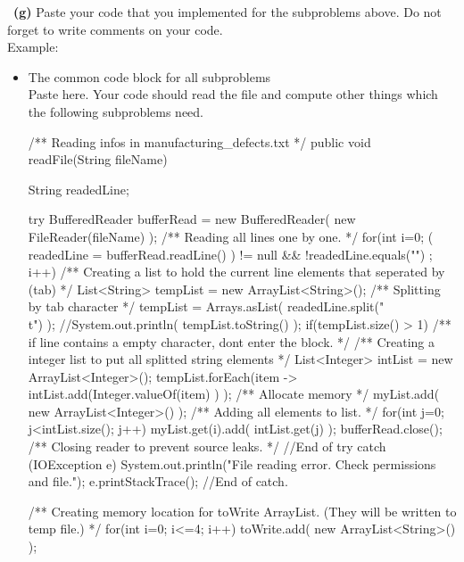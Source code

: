 \documentclass[a4 paper]{article}
\numberwithin{equation}{section}
\newcommand{\subproblem}[1]{~\newline\textbf{(#1)}}
\newcommand{\0}{\mathbf{0}}
\begin{document}
	\subproblem{g} Paste your code that you implemented for the subproblems above. Do not forget to write comments on your code.\\
	Example:\\
	\begin{itemize}
		\item The common code block for all subproblems\\
    		
		Paste here. Your code should read the file and compute other things which the following subproblems need.
            \begin{python}[frame=single]
            /** Reading infos in manufacturing_defects.txt */
    public void readFile(String fileName) {
        String readedLine; 

        try{
            BufferedReader bufferRead = new BufferedReader( new FileReader(fileName) );
            /** Reading all lines one by one. */
            for(int i=0; ( readedLine = bufferRead.readLine() ) != null && !readedLine.equals("\n") ; i++){
                /** Creating a list to hold the current line elements that seperated by (tab) */
                List<String> tempList = new ArrayList<String>();
                /** Splitting by tab character */
                tempList = Arrays.asList( readedLine.split("\\t") );
                //System.out.println( tempList.toString() );
                if(tempList.size() > 1){ /** if line contains a empty character, dont enter the block. */
                    /** Creating a integer list to put all splitted string elements */
                    List<Integer> intList = new ArrayList<Integer>();
                    tempList.forEach(item -> intList.add(Integer.valueOf(item) ) );
                    /** Allocate memory */
                    myList.add( new ArrayList<Integer>() );
                    /** Adding all elements to list. */
                    for(int j=0; j<intList.size(); j++){
                        myList.get(i).add( intList.get(j) );
                    }
                }
            }
            bufferRead.close(); /** Closing reader to prevent source leaks. */
        }  //End of try
        catch (IOException e) {
            System.out.println("File reading error. Check permissions and file.");
            e.printStackTrace();
        }   //End of catch.

        /** Creating memory location for toWrite ArrayList. (They will be written to temp file.) */
        for(int i=0; i<=4; i++)
            toWrite.add( new ArrayList<String>() );
        

}
\end{python}
\end{itemize}
\end{document}
